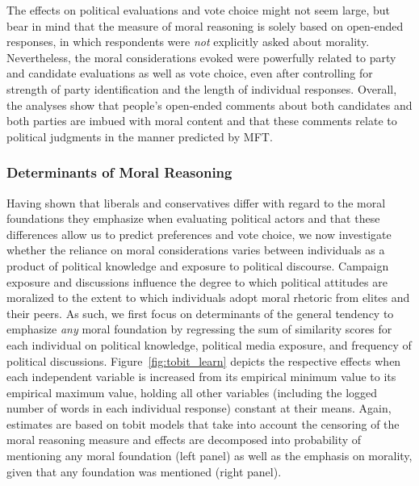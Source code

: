 \documentclass[12pt]{article}
\begin{document}
The effects on political evaluations and vote choice might not seem large, but bear in mind that the measure of moral reasoning is solely based on open-ended responses, in which respondents were \textit{not} explicitly asked about morality. Nevertheless, the moral considerations evoked were powerfully related to party and candidate evaluations as well as vote choice, even after controlling for strength of party identification and the length of individual responses. Overall, the analyses show that people's open-ended comments about both candidates and both parties are imbued with moral content and that these comments relate to political judgments in the manner predicted by MFT.


\subsubsection{Determinants of Moral Reasoning}

Having shown that liberals and conservatives differ with regard to the moral foundations they emphasize when evaluating political actors and that these differences allow us to predict preferences and vote choice, we now investigate whether the reliance on moral considerations varies between individuals as a product of political knowledge and exposure to political discourse. Campaign exposure and discussions influence the degree to which political attitudes are moralized to the extent to which individuals adopt moral rhetoric from elites and their peers. As such, we first focus on determinants of the general tendency to emphasize \textit{any} moral foundation by regressing the sum of similarity scores for each individual on political knowledge, political media exposure, and frequency of political discussions. Figure~\ref{fig:tobit_learn} depicts the respective effects when each independent variable is increased from its empirical minimum value to its empirical maximum value, holding all other variables (including the logged number of words in each individual response) constant at their means. Again, estimates are based on tobit models that take into account the censoring of the moral reasoning measure and effects are decomposed into probability of mentioning any moral foundation (left panel) as well as the emphasis on morality, given that any foundation was mentioned (right panel).
\end{document}

